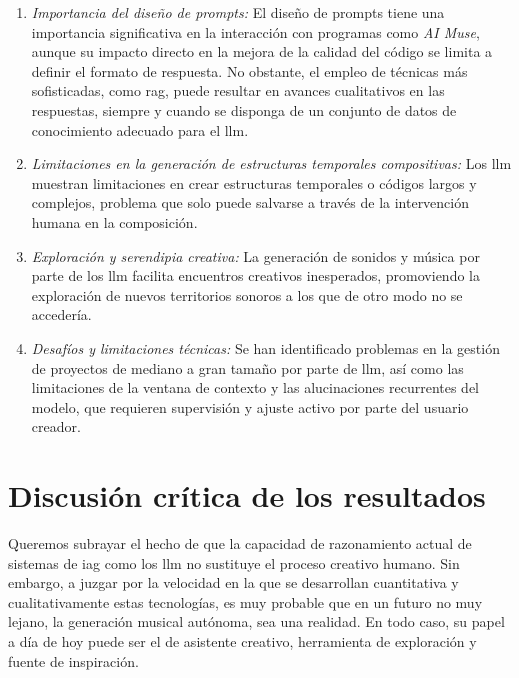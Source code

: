 \begin{enumerate}
    \item \textit{Importancia del diseño de prompts:} El diseño de prompts tiene una importancia significativa en la interacción con programas como \emph{AI Muse}, aunque su impacto directo en la mejora de la calidad del código se limita a definir el formato de respuesta. No obstante, el empleo de técnicas más sofisticadas, como \gls{rag}, puede resultar en avances cualitativos en las respuestas, siempre y cuando se disponga de un conjunto de datos de conocimiento adecuado para el \gls{llm}.
    \item \textit{Limitaciones en la generación de estructuras temporales compositivas:} Los \gls{llm} muestran limitaciones en crear estructuras temporales o códigos largos y complejos, problema que solo puede salvarse a través de la intervención humana en la composición.
    \item \textit{Exploración y serendipia creativa:} La generación de sonidos y música por parte de los \gls{llm} facilita encuentros creativos inesperados, promoviendo la exploración de nuevos territorios sonoros a los que de otro modo no se accedería.
    \item \textit{Desafíos y limitaciones técnicas:} Se han identificado problemas en la gestión de proyectos de mediano a gran tamaño por parte de \gls{llm}, así como las limitaciones de la ventana de contexto y las alucinaciones recurrentes del modelo, que requieren supervisión y ajuste activo por parte del usuario creador.
\end{enumerate}


\section{Discusión crítica de los resultados}

Queremos subrayar el hecho de que la capacidad de razonamiento actual de sistemas de \gls{iag} como los \gls{llm} no sustituye el proceso creativo humano. Sin embargo, a juzgar por la velocidad en la que se desarrollan cuantitativa y cualitativamente estas tecnologías, es muy probable que en un futuro no muy lejano, la generación musical autónoma, sea una realidad. En todo caso, su papel a día de hoy puede ser el de asistente creativo, herramienta de exploración y fuente de inspiración.

